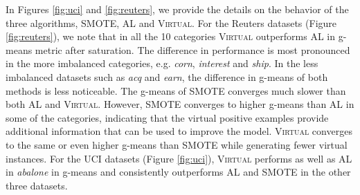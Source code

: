 In Figures \ref{fig:uci} and \ref{fig:reuters},  we provide the details on the behavior of the three algorithms, SMOTE, AL and \textsc{Virtual}. For the Reuters datasets (Figure \ref{fig:reuters}), we note that in all the 10 categories \textsc{Virtual} outperforms AL in g-means metric after saturation. The difference in performance is most pronounced in the more imbalanced categories, e.g. \emph{corn}, \emph{interest} and \emph{ship}. In the less imbalanced datasets such as \emph{acq} and \emph{earn}, the difference in g-means of both methods is less noticeable. The g-means of SMOTE converges much slower than both AL and \textsc{Virtual}. However, SMOTE converges to higher g-means than AL in some of the categories, indicating that the virtual positive examples provide additional information that can be used to improve the model. \textsc{Virtual} converges to the same or even higher g-means than SMOTE while generating fewer virtual instances. For the UCI datasets (Figure \ref{fig:uci}), \textsc{Virtual} performs as well as AL in \emph{abalone} in g-means and consistently outperforms AL and SMOTE in the other three datasets.
